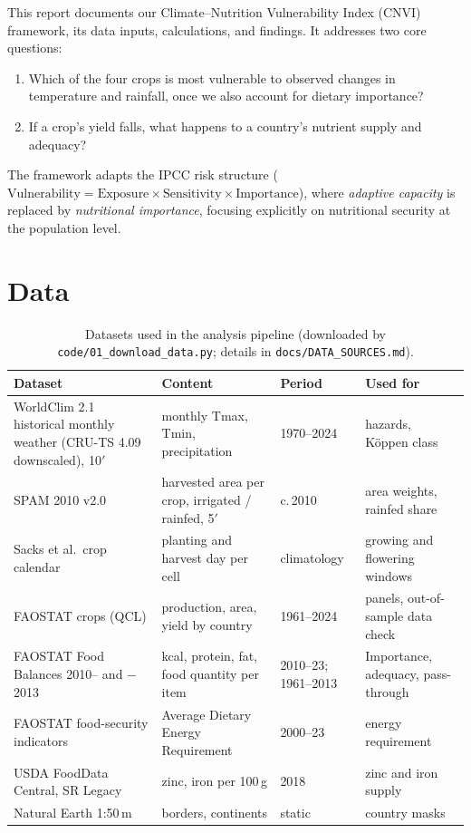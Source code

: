 \documentclass[11pt,a4paper]{article}
\let\parencite\citep
\begin{document}
This report documents our Climate--Nutrition Vulnerability Index (CNVI) framework, its data inputs, calculations, and findings. It addresses two core questions:
\begin{enumerate}
\item Which of the four crops is most vulnerable to observed changes in temperature and rainfall, once we also account for dietary importance?
\item If a crop's yield falls, what happens to a country's nutrient supply and adequacy?
\end{enumerate}
The framework adapts the IPCC risk structure ($\text{Vulnerability} = \text{Exposure} \times \text{Sensitivity} \times \text{Importance}$), where \emph{adaptive capacity} is replaced by \emph{nutritional importance}, focusing explicitly on nutritional security at the population level.

\section{Data}
\begin{table}[H]\centering\scriptsize
\begin{tabular}{p{3.3cm}p{4.3cm}p{1.8cm}p{3.6cm}}
\toprule
Dataset & Content & Period & Used for\\
\midrule
WorldClim 2.1 historical monthly weather (CRU-TS 4.09 downscaled), 10$'$ \parencite{fick2017,harris2020} & monthly Tmax, Tmin, precipitation & 1970--2024 & hazards, K\"oppen class\\
SPAM 2010 v2.0 \parencite{spam2010} & harvested area per crop, irrigated / rainfed, 5$'$ & c.\,2010 & area weights, rainfed share\\
Sacks et al.\ crop calendar \parencite{sacks2010} & planting and harvest day per cell & climatology & growing and flowering windows\\
FAOSTAT crops (QCL) \parencite{faostat} & production, area, yield by country & 1961--2024 & panels, out-of-sample data check\\
FAOSTAT Food Balances 2010-- and $-$2013 & kcal, protein, fat, food quantity per item & 2010--23; 1961--2013 & Importance, adequacy, pass-through\\
FAOSTAT food-security indicators & Average Dietary Energy Requirement & 2000--23 & energy requirement\\
USDA FoodData Central, SR Legacy \parencite{usda2019} & zinc, iron per 100\,g & 2018 & zinc and iron supply\\
Natural Earth 1:50\,m & borders, continents & static & country masks\\
\bottomrule
\end{tabular}
\caption{Datasets used in the analysis pipeline (downloaded by \texttt{code/01\_download\_data.py}; details in \texttt{docs/DATA\_SOURCES.md}).}
\end{table}
\end{document}
